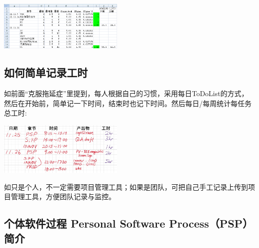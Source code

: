 
\includegraphics[width=6cm]{PSPcalculate3wks95rangeScreenshot_2022-11-26_105325.png}

\hypertarget{tipsux5982ux4f55ux7b80ux5355ux8bb0ux5f55ux5de5ux65f6}{%
\subsection{如何简单记录工时}\label{tipsux5982ux4f55ux7b80ux5355ux8bb0ux5f55ux5de5ux65f6}}

如前面``克服拖延症''里提到，每人根据自己的习惯，采用每日ToDoList的方式，然后在开始前，简单记一下时间，结束时也记下时间。然后每日/每周统计每任务总工时:


\includegraphics[width=6cm]{Psp手工时间表121.jpg}

如只是个人，不一定需要项目管理工具；如果是团队，可把自己手工记录上传到项目管理工具，方便团队记录与监控。

\hypertarget{ux4e2aux4f53ux8f6fux4ef6ux8fc7ux7a0b-personal-software-processpsp-ux7b80ux4ecb}{%
\subsection{个体软件过程 Personal Software Process（PSP）
简介}\label{ux4e2aux4f53ux8f6fux4ef6ux8fc7ux7a0b-personal-software-processpsp-ux7b80ux4ecb}}


